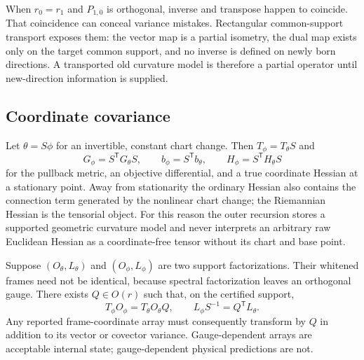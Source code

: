 \documentclass[10pt,twocolumn]{article}
\theoremstyle{definition}
\theoremstyle{remark}
\begin{document}
When $r_0=r_1$ and $P_{1,0}$ is orthogonal, inverse and transpose happen to
coincide.  That coincidence can conceal variance mistakes.  Rectangular
common-support transport exposes them: the vector map is a partial isometry,
the dual map exists only on the target common support, and no inverse is
defined on newly born directions.  A transported old curvature model is
therefore a partial operator until new-direction information is supplied.

\subsection{Coordinate covariance}

Let $\theta=S\phi$ for an invertible, constant chart change.  Then
$T_\phi=T_\theta S$ and
\begin{equation}
 G_\phi=S^{\mathsf T}G_\theta S,\qquad
 b_\phi=S^{\mathsf T}b_\theta,\qquad
 H_\phi=S^{\mathsf T}H_\theta S
 \label{eq:appcoord}
\end{equation}
for the pullback metric, an objective differential, and a true coordinate
Hessian at a stationary point.  Away from stationarity the ordinary Hessian
also contains the connection term generated by the nonlinear chart change;
the Riemannian Hessian is the tensorial object.  For this reason the outer
recursion stores a supported geometric curvature model and never interprets
an arbitrary raw Euclidean Hessian as a coordinate-free tensor without its
chart and base point.

Suppose $(O_\theta,L_\theta)$ and $(O_\phi,L_\phi)$ are two support
factorizations.  Their whitened frames need not be identical, because spectral
factorization leaves an orthogonal gauge.  There exists
$Q\in O(r)$ such that, on the certified support,
\begin{equation}
 T_\phi O_\phi=T_\theta O_\theta Q,\qquad
 L_\phi S^{-1}=Q^{\mathsf T}L_\theta .
 \label{eq:appgauge}
\end{equation}
Any reported frame-coordinate array must consequently transform by $Q$ in
addition to its vector or covector variance.  Gauge-dependent arrays are
acceptable internal state; gauge-dependent physical predictions are not.
\end{document}
